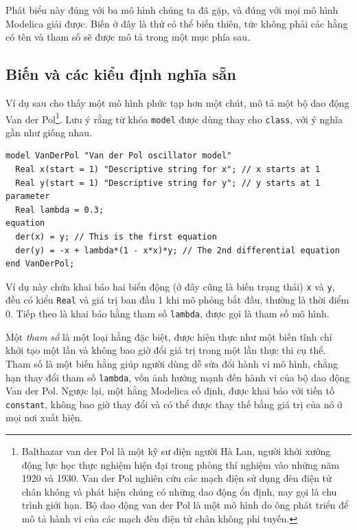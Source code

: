 Phát biểu này đúng với ba mô hình chúng ta đã gặp, và đúng với mọi mô hình Modelica giải được. Biến ở đây là thứ có thể biến thiên, tức không phải các hằng có tên và tham số sẽ được mô tả trong một mục phía sau.

\subsection{Biến và các kiểu định nghĩa sẵn}
Ví dụ sau cho thấy một mô hình phức tạp hơn một chút, mô tả một bộ dao động Van der Pol\footnote{Balthazar van der Pol là một kỹ sư điện người Hà Lan, người khởi xướng động lực học thực nghiệm hiện đại trong phòng thí nghiệm vào những năm 1920 và 1930. Van der Pol nghiên cứu các mạch điện sử dụng đèn điện tử chân không và phát hiện chúng có những dao động ổn định, nay gọi là chu trình giới hạn. Bộ dao động van der Pol là một mô hình do ông phát triển để mô tả hành vi của các mạch đèn điện tử chân không phi tuyến.}. Lưu ý rằng từ khóa \texttt{model} được dùng thay cho \texttt{class}, với ý nghĩa gần như giống nhau.
\begin{verbatim}
model VanDerPol "Van der Pol oscillator model"
  Real x(start = 1) "Descriptive string for x"; // x starts at 1
  Real y(start = 1) "Descriptive string for y"; // y starts at 1
parameter
  Real lambda = 0.3;
equation
  der(x) = y; // This is the first equation
  der(y) = -x + lambda*(1 - x*x)*y; // The 2nd differential equation
end VanDerPol;
\end{verbatim}
Ví dụ này chứa khai báo hai biến động (ở đây cũng là biến trạng thái) \texttt{x} và \texttt{y}, đều có kiểu \texttt{Real} và giá trị ban đầu 1 khi mô phỏng bắt đầu, thường là thời điểm 0. Tiếp theo là khai báo hằng tham số \texttt{lambda}, được gọi là tham số mô hình.

Một \emph{tham số} là một loại hằng đặc biệt, được hiện thực như một biến tĩnh chỉ khởi tạo một lần và không bao giờ đổi giá trị trong một lần thực thi cụ thể. Tham số là một biến hằng giúp người dùng dễ sửa đổi hành vi mô hình, chẳng hạn thay đổi tham số \texttt{lambda}, vốn ảnh hưởng mạnh đến hành vi của bộ dao động Van der Pol. Ngược lại, một hằng Modelica cố định, được khai báo với tiền tố \texttt{constant}, không bao giờ thay đổi và có thể được thay thế bằng giá trị của nó ở mọi nơi xuất hiện.

